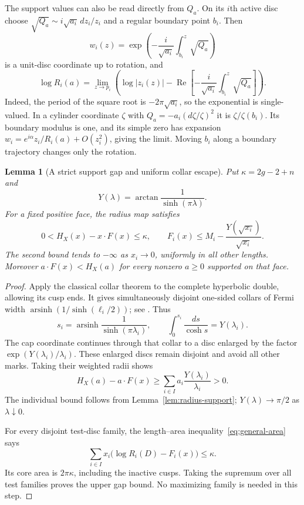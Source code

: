 \documentclass[11pt,a4paper]{article}
\newtheorem{lemma}[theorem]{Lemma}
\theoremstyle{definition}
\begin{document}
The support values can also be read directly from $Q_a$. On its $i$th active disc choose $\sqrt{Q_a}\sim i\sqrt{a_i}\,dz_i/z_i$ and a regular boundary point $b_i$. Then
\[
 w_i(z)=\exp\left(-\frac{i}{\sqrt{a_i}}\int_{b_i}^{z}\sqrt{Q_a}\right)
\]
is a unit-disc coordinate up to rotation, and
\[
 \log R_i(a)=\lim_{z\to p_i}\left(
 \log|z_i(z)|-\operatorname{Re}\left[-\frac{i}{\sqrt{a_i}}
                                  \int_{b_i}^{z}\sqrt{Q_a}\right]\right).
\]
Indeed, the period of the square root is $-2\pi\sqrt{a_i}$, so the exponential is single-valued. In a cylinder coordinate $\zeta$ with $Q_a=-a_i(d\zeta/\zeta)^2$ it is $\zeta/\zeta(b_i)$. Its boundary modulus is one, and its simple zero has expansion $w_i=e^{i\alpha}z_i/R_i(a)+O(z_i^2)$, giving the limit. Moving $b_i$ along a boundary trajectory changes only the rotation.

\begin{lemma}[A strict support gap and uniform collar escape]\label{lem:support-gap}
Put $\kappa=2g-2+n$ and
\[
 Y(\lambda)=\arctan\frac{1}{\sinh(\pi\lambda)}.
\]
For a fixed positive face, the radius map satisfies
\[
 0<H_X(x)-x\cdot F(x)\le\kappa,
 \qquad
 F_i(x)\le M_i-\frac{Y(\sqrt{x_i})}{\sqrt{x_i}}.
\]
The second bound tends to $-\infty$ as $x_i\to0$, uniformly in all other lengths. Moreover $a\cdot F(x)<H_X(a)$ for every nonzero $a\ge0$ supported on that face.
\end{lemma}
\begin{proof}
Apply the classical collar theorem to the complete hyperbolic double, allowing its cusp ends. It gives simultaneously disjoint one-sided collars of Fermi width $\operatorname{arsinh}(1/\sinh(\ell_i/2))$; see \cite[Theorem~2.18 and proof, pp.~22--24]{McMullen}. Thus
\[
 s_i=\operatorname{arsinh}\frac1{\sinh(\pi\lambda_i)},
 \qquad \int_0^{s_i}\frac{ds}{\cosh s}=Y(\lambda_i).
\]
The cap coordinate continues through that collar to a disc enlarged by the factor $\exp(Y(\lambda_i)/\lambda_i)$. These enlarged discs remain disjoint and avoid all other marks. Taking their weighted radii shows
\[
 H_X(a)-a\cdot F(x)\ge
          \sum_{i\in I}a_i\frac{Y(\lambda_i)}{\lambda_i}>0.
\]
The individual bound follows from Lemma~\ref{lem:radius-support}; $Y(\lambda)\to\pi/2$ as $\lambda\downarrow0$.

For every disjoint test-disc family, the length--area inequality~\eqref{eq:general-area} says
\[
       \sum_{i\in I}x_i\bigl(\log R_i(D)-F_i(x)\bigr)\le\kappa.
\]
Its core area is $2\pi\kappa$, including the inactive cusps. Taking the supremum over all test families proves the upper gap bound. No maximizing family is needed in this step.
\end{proof}
\end{document}
